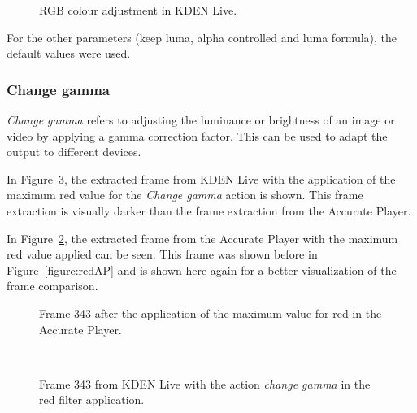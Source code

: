 \documentclass[../MasterThesis.tex]{subfiles}
\begin{document}
\begin{figure}[H]
	\begin{center}
		\caption[RGB colour adjustment in KDEN Live.]{RGB colour adjustment in KDEN Live.}
		\label{figure:kdenlive_rgb}
	\end{center}
\end{figure}


For the other parameters (keep luma, alpha controlled and luma formula), the default values were used.












\subsubsection*{Change gamma}

\textit{Change gamma} refers to adjusting the luminance or brightness of an image or video by applying a gamma correction factor. This can be used to adapt the output to different devices.~\cite{gamma}

In Figure~\ref{figure:gamma}, the extracted frame from KDEN Live with the application of the maximum red value for the \textit{Change gamma} action is shown. This frame extraction is visually darker than the frame extraction from the Accurate Player.

In Figure~\ref{figure:APframe1}, the extracted frame from the Accurate Player with the maximum red value applied can be seen. This frame was shown before in Figure~\ref{figure:redAP} and is shown here again for a better visualization of the frame comparison.

\begin{minipage}{0.48\textwidth}
	\begin{figure}[H]
		\begin{center}
			\caption[Frame 343 after the application of the red filter in the Accurate Player.]{Frame 343 after the application of the maximum value for red in the Accurate Player.}
			\label{figure:APframe1}
		\end{center}
	\end{figure}
\end{minipage}\begin{minipage}{0.04\textwidth}
	\ 
\end{minipage}\begin{minipage}{0.48\textwidth}
	\begin{figure}[H]
		\begin{center}
			\caption[Frame 343 from KDEN Live with the action \textit{change gamma}.]{Frame 343 from KDEN Live with the action \textit{change gamma} in the red filter application.}
			\label{figure:gamma}
		\end{center}
	\end{figure}
\end{minipage}
\end{document}
